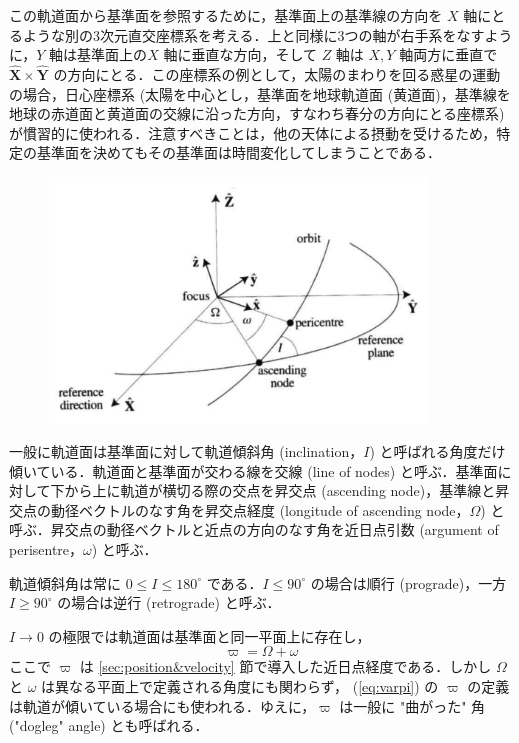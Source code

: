 \documentclass[11pt,a4paper,oneside,onecolumn]{jarticle}
\begin{document}
この軌道面から基準面を参照するために，基準面上の基準線の方向を $X$ 軸にとるような別の3次元直交座標系を考える．上と同様に3つの軸が右手系をなすように，$Y$  軸は基準面上の$X$ 軸に垂直な方向，そして $Z$ 軸は $X, Y$ 軸両方に垂直で $\hat{\bm X} \times \hat{\bm Y}$ の方向にとる．この座標系の例として，太陽のまわりを回る惑星の運動の場合，日心座標系 (太陽を中心とし，基準面を地球軌道面 (黄道面)，基準線を地球の赤道面と黄道面の交線に沿った方向，すなわち春分の方向にとる座標系) が慣習的に使われる．注意すべきことは，他の天体による摂動を受けるため，特定の基準面を決めてもその基準面は時間変化してしまうことである．

\begin{figure}[H]
\centering
\includegraphics[width=10cm]{./image/sec2_13.pdf}
\caption{\label{fig:elements_SSD}}
\end{figure}

一般に軌道面は基準面に対して軌道傾斜角 (inclination，$I$) と呼ばれる角度だけ傾いている．軌道面と基準面が交わる線を交線 (line of nodes) と呼ぶ．基準面に対して下から上に軌道が横切る際の交点を昇交点 (ascending node)，基準線と昇交点の動径ベクトルのなす角を昇交点経度 (longitude of ascending node，$\Omega$) と呼ぶ．昇交点の動径ベクトルと近点の方向のなす角を近日点引数 (argument of perisentre，$\omega$) と呼ぶ．

軌道傾斜角は常に $0 \leq I \leq 180^{\circ}$ である．$I \leq 90 ^{\circ}$ の場合は順行 (prograde)，一方 $I \geq 90 ^{\circ}$ の場合は逆行 (retrograde) と呼ぶ．

$I \to 0$ の極限では軌道面は基準面と同一平面上に存在し，
\begin{equation}
\varpi = \Omega + \omega \label{eq:varpi}
\end{equation}
ここで $\varpi$ は \ref{sec:position&velocity} 節で導入した近日点経度である．しかし $\Omega$ と $\omega$ は異なる平面上で定義される角度にも関わらず， (\ref{eq:varpi}) の $\varpi$ の定義は軌道が傾いている場合にも使われる．ゆえに，$\varpi$ は一般に "曲がった" 角 ("dogleg" angle) とも呼ばれる．
\end{document}

